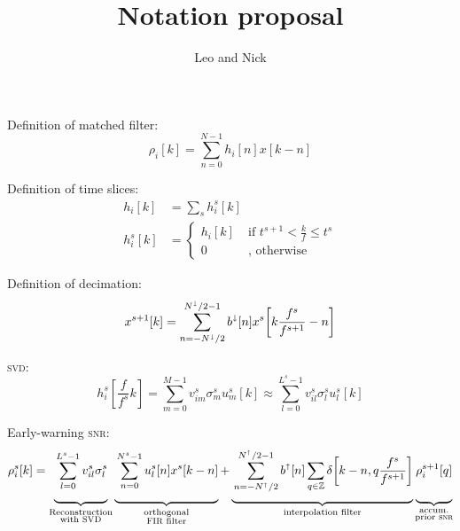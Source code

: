 \documentclass[letterpaper,11pt]{article}
\title{Notation proposal}
\author{Leo and Nick}
\begin{document}
\maketitle

Definition of matched filter:
\begin{equation}
\rho_i [k] = \sum_{n=0}^{N-1} h_{i}[n] x [k-n]
\end{equation}

Definition of time slices:
\begin{align}
h_{i}[k] &= \sum_s h_{i}^{s}[k] \\
h_{i}^{s}[k] &= \left\{ \begin{aligned}
    h_{i}[k] & \; \text{if } t^{s+1} < \frac{k}{f} \leq t^{s} \\
    0 & \; \text{, otherwise }
    \end{aligned} \right.
\end{align}

Definition of decimation:
\begin{equation}
x^{s+1}[k] = \sum_{n=-N^\shortdownarrow/2}^{N^\shortdownarrow/2-1} b^\shortdownarrow[n] x^{s}\!\left[k \frac{f^{s}}{f^{s+1}} - n\right]
\end{equation}

\textsc{svd}:
\begin{equation}
h^{s}_{i}\!\left[\frac{f}{f^{s}} k\right] = \sum_{m=0}^{M-1} v^{s}_{im} \sigma^{s}_m u^{s}_{m}[k] \approx \sum_{l=0}^{L^s-1} v^{s}_{il} \sigma^{s}_l u^{s}_{l}[k]
\end{equation}

Early-warning \textsc{snr}:
\newcommand{\mystrut}{\rule[-2em]{0pt}{0pt}}
\begin{equation}
    \rho^{s}_i[k] = \underbrace{\mystrut\sum_{l=0}^{L^{s}-1} v^{s}_{il} \sigma^{s}_l}_{\substack{\text{Reconstruction}\\ \text{with {\sc SVD}}}}
    \underbrace{\mystrut\sum_{n=0}^{N^{s} - 1} u^{s}_{l}[n] x^{s}[k-n]}_{\substack{\text{orthogonal}\\ \text{{\sc FIR} filter}}} + \underbrace{\mystrut\sum_{n=-N^\shortuparrow/2}^{N^\shortuparrow/2-1} b^\shortuparrow[n] \sum_{q \in \mathbb{Z}} \delta\!\left[k-n, q \frac{f^{s}}{f^{s+1}}\right]}_\text{interpolation filter} \underbrace{\mystrut\rho^{s+1}_i[q]}_{\substack{\text{accum.}\\ \text{prior {\sc snr}}}}
\end{equation}
\end{document}
